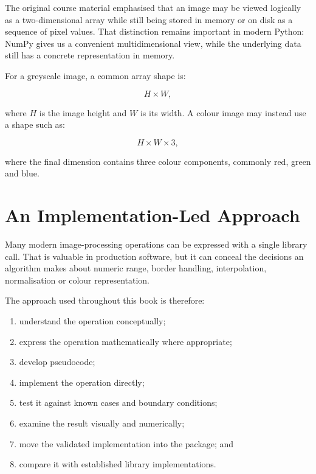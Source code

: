 The original course material emphasised that an image may be viewed logically
as a two-dimensional array while still being stored in memory or on disk as a
sequence of pixel values. That distinction remains important in modern Python:
NumPy gives us a convenient multidimensional view, while the underlying data
still has a concrete representation in memory.

For a greyscale image, a common array shape is:

\begin{equation}
    H \times W,
\end{equation}

where $H$ is the image height and $W$ is its width. A colour image may instead
use a shape such as:

\begin{equation}
    H \times W \times 3,
\end{equation}

where the final dimension contains three colour components, commonly red,
green and blue.

\section{An Implementation-Led Approach}

Many modern image-processing operations can be expressed with a single library
call. That is valuable in production software, but it can conceal the decisions
an algorithm makes about numeric range, border handling, interpolation,
normalisation or colour representation.

The approach used throughout this book is therefore:

\begin{enumerate}
    \item understand the operation conceptually;
    \item express the operation mathematically where appropriate;
    \item develop pseudocode;
    \item implement the operation directly;
    \item test it against known cases and boundary conditions;
    \item examine the result visually and numerically;
    \item move the validated implementation into the \pyimage{} package; and
    \item compare it with established library implementations.
\end{enumerate}

